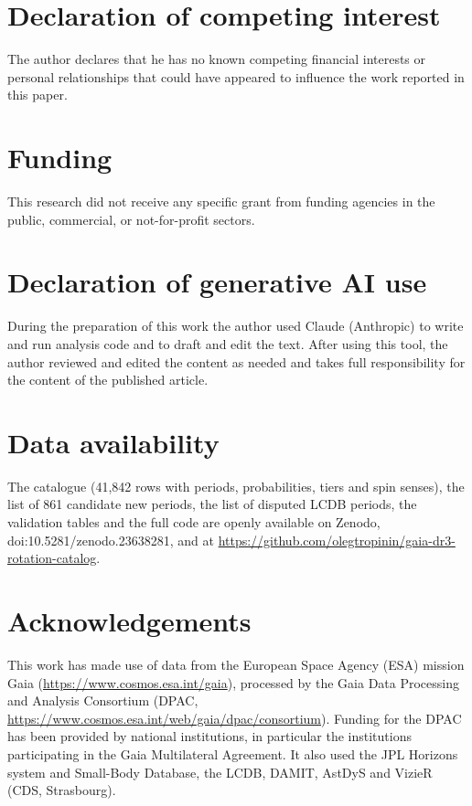 \documentclass[preprint,12pt,authoryear]{elsarticle}
\begin{document}
\section*{Declaration of competing interest}
The author declares that he has no known competing financial interests or personal relationships that could
have appeared to influence the work reported in this paper.

\section*{Funding}
This research did not receive any specific grant from funding agencies in the public, commercial, or
not-for-profit sectors.

\section*{Declaration of generative AI use}
During the preparation of this work the author used Claude (Anthropic) to write and run analysis code and
to draft and edit the text. After using this tool, the author reviewed and edited the content as needed and
takes full responsibility for the content of the published article.

\section*{Data availability}
The catalogue (41{,}842 rows with periods, probabilities, tiers and spin senses), the list of 861 candidate
new periods, the list of disputed LCDB periods, the validation tables and the full code are openly available
on Zenodo, doi:10.5281/zenodo.23638281, and at \url{https://github.com/olegtropinin/gaia-dr3-rotation-catalog}.

\section*{Acknowledgements}
This work has made use of data from the European Space Agency (ESA) mission Gaia
(\url{https://www.cosmos.esa.int/gaia}), processed by the Gaia Data Processing and Analysis Consortium (DPAC,
\url{https://www.cosmos.esa.int/web/gaia/dpac/consortium}). Funding for the DPAC has been provided by national
institutions, in particular the institutions participating in the Gaia Multilateral Agreement. It also used
the JPL Horizons system and Small-Body Database, the LCDB, DAMIT, AstDyS and VizieR (CDS, Strasbourg).


\end{document}
